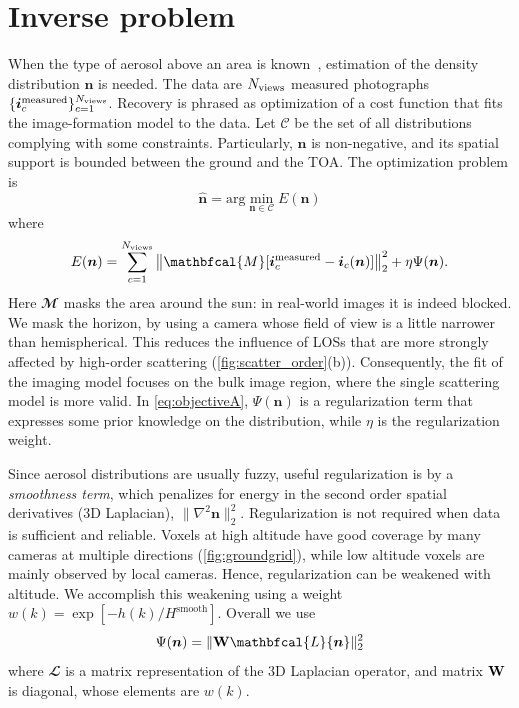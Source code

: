\documentclass[10pt,letterpaper]{article}
\newcommand{\argmin}{\mathrm{arg}\min}
\newcommand{\vect}[1]{\bm{#1}}
\newcommand{\MaskSun}{\mathbfcal{M}}
\newcommand{\Laplacian}{\mathbfcal{L}}
\newcommand{\DistSet}{\mathcal{C}}
\newcommand{\DistUnknown}{\vect{n}}
\newcommand{\DistEstimated}{\hat{\vect{n}}}
\newcommand{\CostFunc}[1]{E(#1)}
\begin{document}

\section{Inverse problem}
\label{sec:inverse-problem}

When the type of aerosol above an area is known~\cite{Martonchik2009},
estimation of the density distribution $\DistUnknown$ is needed. The
data are $N_{\rm views}$ measured photographs $\{ {\bm i}^{\rm
  measured}_c\}_{c=1}^{N_{\rm views}}$. Recovery is phrased as
optimization of a cost function that fits the image-formation model to
the data. Let $\DistSet$ be the set of all distributions complying
with some constraints.  Particularly, $\DistUnknown$ is non-negative,
and its spatial support is bounded between the ground and the TOA. The
optimization problem is
\begin{equation}
  \label{eq:minobjectiveA}
  \DistEstimated =
  \argmin_{\DistUnknown \in \DistSet} \CostFunc{\DistUnknown}
\end{equation}
where
\begin{equation}
  \label{eq:objectiveA}
  \CostFunc{\DistUnknown}
  = \sum_{c=1}^{N_{\rm views}}
  \left\|
    \MaskSun[{\bm i}^{\rm measured}_c - {\bm i}_c({\bm n})]
  \right\|^2_2  + \eta \Psi({\bm n}).
\end{equation}
Here $\MaskSun$ masks the area around the sun: in real-world images
it is indeed blocked. We mask the horizon, by using a camera whose
field of view is a little narrower than hemispherical. This reduces
the influence of LOSs that are more strongly affected by high-order
scattering (\cref{fig:scatter_order}(b)). Consequently,
the fit of the imaging model focuses on the bulk image region, where
the single scattering model is more valid.  In \cref{eq:objectiveA},
$\Psi({\bm n})$ is a regularization term that expresses some prior
knowledge on the distribution, while $\eta$ is the regularization weight.

Since aerosol distributions are usually fuzzy, useful regularization
is by a {\em smoothness term}, which penalizes for energy in the second order
spatial derivatives (3D Laplacian), $\| \nabla^2{\bm
  n}\|^2_2$. Regularization is not required when data is sufficient
and reliable.  Voxels at high
altitude have good coverage by many cameras at multiple directions (\cref{fig:groundgrid}),
while low altitude voxels are mainly observed by local
cameras. Hence, regularization can be weakened with altitude. We
accomplish this weakening using a weight
$w(k)=\exp\left[-h(k)/H^\mathrm{smooth}\right]$.  Overall we use
\begin{equation}
  \label{eq:regularizer}
  \Psi({\bm n}) = \| {\bf W} \Laplacian{\bm n}\|^2_2
\end{equation}
where $\Laplacian$ is a matrix representation of the 3D Laplacian
operator, and matrix ${\bf W}$ is diagonal, whose elements are $w(k)$.
\end{document}
